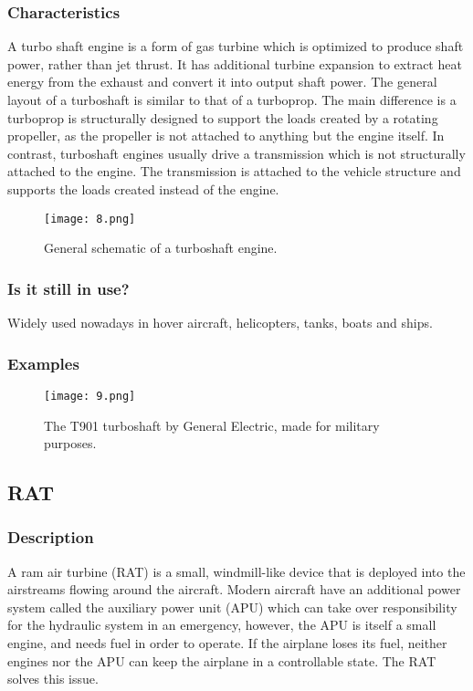 \documentclass[12pt, letterpaper]{article}
\begin{document}
\subsubsection*{Characteristics}
A turbo shaft engine is a form of gas turbine which is optimized to produce shaft power, rather than jet thrust. It has additional turbine expansion to extract heat energy from the exhaust and convert it into output shaft power.
The general layout of a turboshaft is similar to that of a turboprop. The main difference is a turboprop is structurally designed to support the loads created by a rotating propeller, as the propeller is not attached to anything but the engine itself. In contrast, turboshaft engines usually drive a transmission which is not structurally attached to the engine. The transmission is attached to the vehicle structure and supports the loads created instead of the engine.
\begin{figure}[H]
	\centering
	\texttt{[image: 8.png]}
	\caption{General schematic of a turboshaft engine.}
\end{figure}
\subsubsection*{Is it still in use?}
Widely used nowadays in hover aircraft, helicopters, tanks, boats and ships.

\subsubsection*{Examples}
\begin{figure}[H]
	\centering
	\texttt{[image: 9.png]}
	\caption{The T901 turboshaft by General Electric, made for military purposes.}
\end{figure}

\subsection*{RAT}

\subsubsection*{Description}
A ram air turbine (RAT) is a small, windmill-like device that is deployed into the airstreams flowing around the aircraft. Modern aircraft have an additional power system called the auxiliary power unit (APU) which can take over responsibility for the hydraulic system in an emergency, however, the APU is itself a small engine, and needs fuel in order to operate. If the airplane loses its fuel, neither engines nor the APU can keep the airplane in a controllable state. The RAT solves this issue. 
\end{document}
